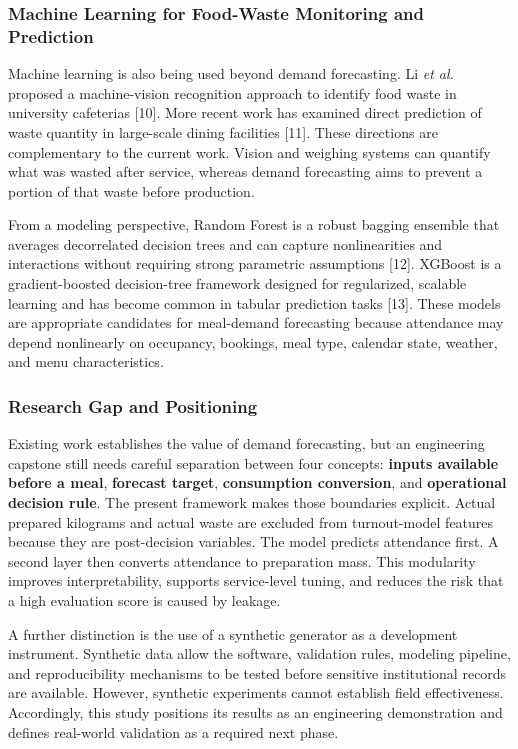 \documentclass[conference]{IEEEtran}
\begin{document}
\subsubsection{Machine Learning for Food-Waste Monitoring and
Prediction}\label{machine-learning-for-food-waste-monitoring-and-prediction}

Machine learning is also being used beyond demand forecasting. Li
\emph{et al.} proposed a machine-vision recognition approach to identify
food waste in university cafeterias {[}10{]}. More recent work has
examined direct prediction of waste quantity in large-scale dining
facilities {[}11{]}. These directions are complementary to the current
work. Vision and weighing systems can quantify what was wasted after
service, whereas demand forecasting aims to prevent a portion of that
waste before production.

From a modeling perspective, Random Forest is a robust bagging ensemble
that averages decorrelated decision trees and can capture nonlinearities
and interactions without requiring strong parametric assumptions
{[}12{]}. XGBoost is a gradient-boosted decision-tree framework designed
for regularized, scalable learning and has become common in tabular
prediction tasks {[}13{]}. These models are appropriate candidates for
meal-demand forecasting because attendance may depend nonlinearly on
occupancy, bookings, meal type, calendar state, weather, and menu
characteristics.

\subsubsection{Research Gap and
Positioning}\label{research-gap-and-positioning}

Existing work establishes the value of demand forecasting, but an
engineering capstone still needs careful separation between four
concepts: \textbf{inputs available before a meal}, \textbf{forecast
target}, \textbf{consumption conversion}, and \textbf{operational
decision rule}. The present framework makes those boundaries explicit.
Actual prepared kilograms and actual waste are excluded from
turnout-model features because they are post-decision variables. The
model predicts attendance first. A second layer then converts attendance
to preparation mass. This modularity improves interpretability, supports
service-level tuning, and reduces the risk that a high evaluation score
is caused by leakage.

A further distinction is the use of a synthetic generator as a
development instrument. Synthetic data allow the software, validation
rules, modeling pipeline, and reproducibility mechanisms to be tested
before sensitive institutional records are available. However, synthetic
experiments cannot establish field effectiveness. Accordingly, this
study positions its results as an engineering demonstration and defines
real-world validation as a required next phase.
\end{document}

